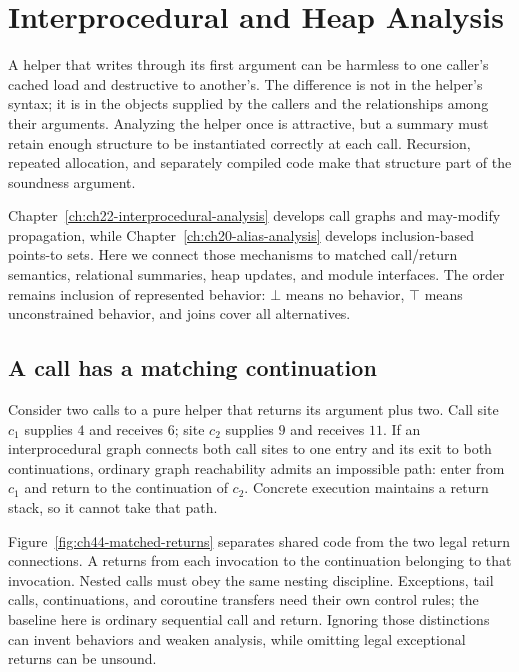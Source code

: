 \chapter{Interprocedural and Heap Analysis}
\label{ch:interprocedural-heap-analysis}

A helper that writes through its first argument can be harmless to one caller's cached load and destructive to another's.
The difference is not in the helper's syntax; it is in the objects supplied by the callers and the relationships among their arguments.
Analyzing the helper once is attractive, but a summary must retain enough structure to be instantiated correctly at each call.
Recursion, repeated allocation, and separately compiled code make that structure part of the soundness argument.

Chapter~\ref{ch:ch22-interprocedural-analysis} develops call graphs and may-modify propagation, while Chapter~\ref{ch:ch20-alias-analysis} develops inclusion-based points-to sets.
Here we connect those mechanisms to matched call/return semantics, relational summaries, heap updates, and module interfaces.
The order remains inclusion of represented behavior: $\bot$ means no behavior, $\top$ means unconstrained behavior, and joins cover all alternatives.

\section{A call has a matching continuation}
\label{sec:ch44-matched}

Consider two calls to a pure helper that returns its argument plus two.
Call site $c_1$ supplies $4$ and receives $6$; site $c_2$ supplies $9$ and receives $11$.
If an interprocedural graph connects both call sites to one entry and its exit to both continuations, ordinary graph reachability admits an impossible path: enter from $c_1$ and return to the continuation of $c_2$.
Concrete execution maintains a return stack, so it cannot take that path.

Figure~\ref{fig:ch44-matched-returns} separates shared code from the two legal return connections.
A  returns from each invocation to the continuation belonging to that invocation.
Nested calls must obey the same nesting discipline.
Exceptions, tail calls, continuations, and coroutine transfers need their own control rules; the baseline here is ordinary sequential call and return.
Ignoring those distinctions can invent behaviors and weaken analysis, while omitting legal exceptional returns can be unsound.

